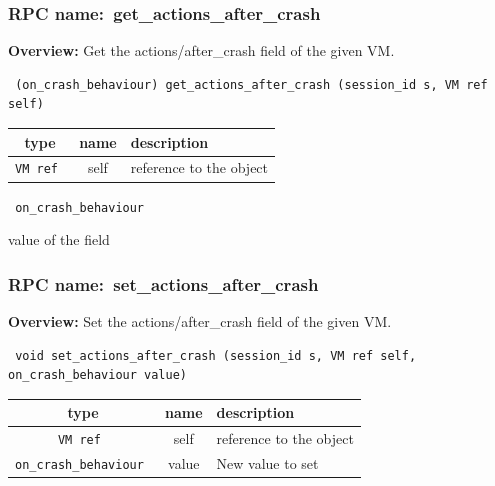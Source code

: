 \subsubsection{RPC name:~get\_actions\_after\_crash}

{\bf Overview:} 
Get the actions/after\_crash field of the given VM.

\begin{verbatim} (on_crash_behaviour) get_actions_after_crash (session_id s, VM ref self)\end{verbatim}



 
\vspace{0.3cm}
\begin{tabular}{|c|c|p{7cm}|}
 \hline
{\bf type} & {\bf name} & {\bf description} \\ \hline
{\tt VM ref } & self & reference to the object \\ \hline 

\end{tabular}

\vspace{0.3cm}

{\tt 
on\_crash\_behaviour
}


value of the field
\vspace{0.3cm}
\vspace{0.3cm}
\vspace{0.3cm}
\subsubsection{RPC name:~set\_actions\_after\_crash}

{\bf Overview:} 
Set the actions/after\_crash field of the given VM.

\begin{verbatim} void set_actions_after_crash (session_id s, VM ref self, on_crash_behaviour value)\end{verbatim}



 
\vspace{0.3cm}
\begin{tabular}{|c|c|p{7cm}|}
 \hline
{\bf type} & {\bf name} & {\bf description} \\ \hline
{\tt VM ref } & self & reference to the object \\ \hline 

{\tt on\_crash\_behaviour } & value & New value to set \\ \hline 

\end{tabular}

